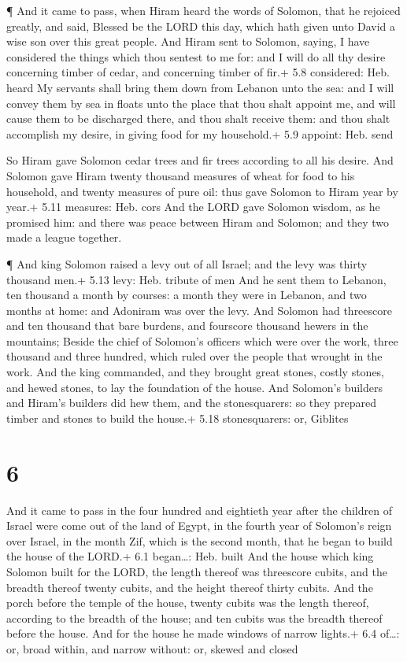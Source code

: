  ¶ And it came to pass, when Hiram heard the words of
Solomon, that he rejoiced greatly, and said, Blessed be the LORD this
day, which hath given unto David a wise son over this great people.
 And Hiram sent to Solomon, saying, I have considered the
things which thou sentest to me for: and I will do all thy desire
concerning timber of cedar, and concerning timber of fir.+ 5.8
considered: Heb. heard  My servants shall bring them down
from Lebanon unto the sea: and I will convey them by sea in floats unto
the place that thou shalt appoint me, and will cause them to be
discharged there, and thou shalt receive them: and thou shalt accomplish
my desire, in giving food for my household.+ 5.9 appoint: Heb. send

 So Hiram gave Solomon cedar trees and fir trees according
to all his desire.  And Solomon gave Hiram twenty thousand
measures of wheat for food to his household, and twenty measures of pure
oil: thus gave Solomon to Hiram year by year.+ 5.11 measures: Heb. cors
 And the LORD gave Solomon wisdom, as he promised him: and
there was peace between Hiram and Solomon; and they two made a league
together.

 ¶ And king Solomon raised a levy out of all Israel; and
the levy was thirty thousand men.+ 5.13 levy: Heb. tribute of men
 And he sent them to Lebanon, ten thousand a month by
courses: a month they were in Lebanon, and two months at home: and
Adoniram was over the levy.  And Solomon had threescore and
ten thousand that bare burdens, and fourscore thousand hewers in the
mountains;  Beside the chief of Solomon's officers which
were over the work, three thousand and three hundred, which ruled over
the people that wrought in the work.  And the king
commanded, and they brought great stones, costly stones, and hewed
stones, to lay the foundation of the house.  And Solomon's
builders and Hiram's builders did hew them, and the stonesquarers: so
they prepared timber and stones to build the house.+ 5.18 stonesquarers:
or, Giblites

\hypertarget{section-5}{%
\section{6}\label{section-5}}

 And it came to pass in the four hundred and eightieth year
after the children of Israel were come out of the land of Egypt, in the
fourth year of Solomon's reign over Israel, in the month Zif, which is
the second month, that he began to build the house of the LORD.+ 6.1
began\ldots: Heb. built  And the house which king Solomon
built for the LORD, the length thereof was threescore cubits, and the
breadth thereof twenty cubits, and the height thereof thirty cubits.
 And the porch before the temple of the house, twenty cubits
was the length thereof, according to the breadth of the house; and ten
cubits was the breadth thereof before the house.  And for
the house he made windows of narrow lights.+ 6.4 of\ldots: or, broad
within, and narrow without: or, skewed and closed

